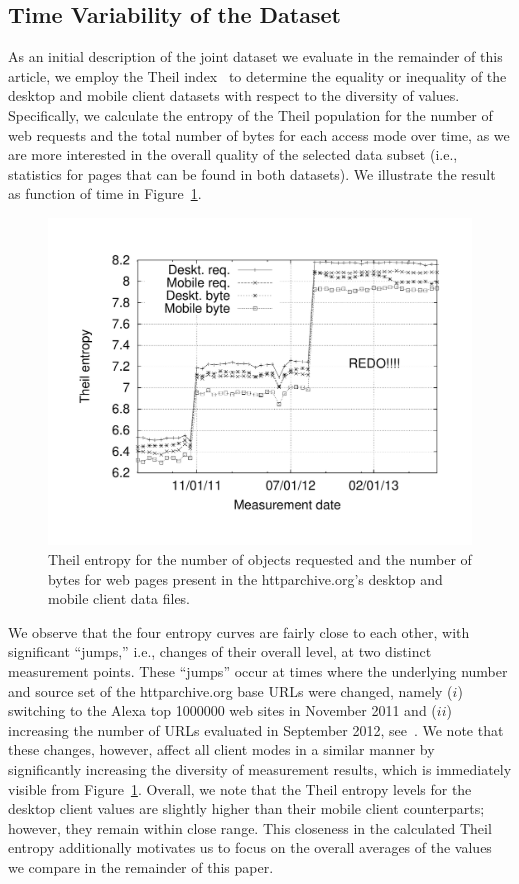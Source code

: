 \documentclass[onecolumn,12pt]{IEEEtran}
\begin{document}
\subsection{Time Variability of the Dataset}
As an initial description of the joint dataset we evaluate in the remainder of this article, we employ the Theil index~\cite{Th72} to determine the equality or inequality of the desktop and mobile client datasets with respect to the diversity of values.
Specifically, we calculate the entropy of the Theil population for the number of web requests and the total number of bytes for each access mode over time, as we are more interested in the overall quality of the selected data subset (i.e., statistics for pages that can be found in both datasets).
\uline{}
We illustrate the result as function of time in Figure~\ref{fig:theil}.
\begin{figure}
	\centering
	\includegraphics[width=.5\linewidth]{theil}
	\caption{Theil entropy for the number of objects requested and the number of bytes for web pages present in the httparchive.org's desktop and mobile client data files.}
	\label{fig:theil}
\end{figure}
We observe that the four entropy curves are fairly close to each other, with significant ``jumps,'' i.e., changes of their overall level, at two distinct measurement points. 
These ``jumps'' occur at times where the underlying number and source set of the httparchive.org base URLs were changed, namely ($i$) switching to the Alexa top 1000000 web sites in November 2011 and ($ii$) increasing the number of URLs evaluated in September 2012, see~\cite{ht13}.
We note that these changes, however, affect all client modes in a similar manner by significantly increasing the diversity of measurement results, which is immediately visible from Figure~\ref{fig:theil}.
Overall, we note that the Theil entropy levels for the desktop client values are slightly higher than their mobile client counterparts; however, they remain within close range.
This closeness in the calculated Theil entropy additionally motivates us to focus on the overall averages of the values we compare in the remainder of this paper.
\end{document}
